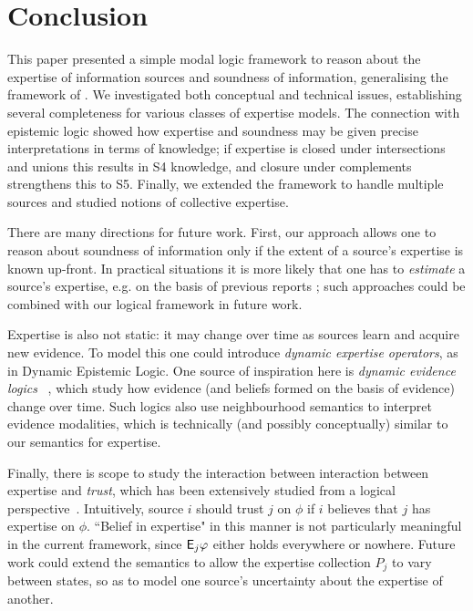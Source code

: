 \section{Conclusion}
\label{sec_conclusion}

This paper presented a simple modal logic framework to reason about the
expertise of information sources and soundness of information, generalising the
framework of \citet{singleton2021logic}. We investigated both conceptual and
technical issues, establishing several completeness for various classes of
expertise models. The connection with epistemic logic showed how expertise and
soundness may be given precise interpretations in terms of knowledge; if
expertise is closed under intersections and unions this results in S4
knowledge, and closure under complements strengthens this to S5. Finally, we
extended the framework to handle multiple sources and studied notions of
collective expertise.

There are many directions for future work.
%
First, our approach allows one to reason about soundness of information
only if the extent of a source's expertise is known up-front. In practical
situations it is more likely that one has to \emph{estimate} a source's
expertise, e.g. on the basis of previous reports
\citep{hunter_building_2021,dastani2004inferring}; such approaches could be
combined with our logical framework in future work.

Expertise is also not static: it may change over time as sources learn and
acquire new evidence. To model this one could introduce \emph{dynamic expertise
operators}, as in Dynamic Epistemic Logic. One
source of inspiration here is \emph{dynamic evidence logics}
~\citep{van2011dynamic,vanbenthem2014106}, which study how evidence (and
beliefs formed on the basis of evidence) change over time. Such logics also use
neighbourhood semantics to interpret evidence modalities, which is technically
(and possibly conceptually) similar to our semantics for expertise.

Finally, there is scope to study the interaction between interaction between
expertise and \emph{trust}, which has been extensively studied from a logical
perspective~\citep{booth_trust_2018,Liau_2003,lorini2014trust,herzig2010logic}.
Intuitively, source $i$ should trust $j$ on $\phi$ if $i$ believes that $j$ has
expertise on $\phi$. ``Belief in expertise" in this manner is not particularly
meaningful in the current framework, since $\mathsf{E}_j\varphi$ either holds everywhere
or nowhere. Future work could extend the semantics to allow the expertise
collection $P_j$ to vary between states, so as to model one source's
uncertainty about the expertise of another.
